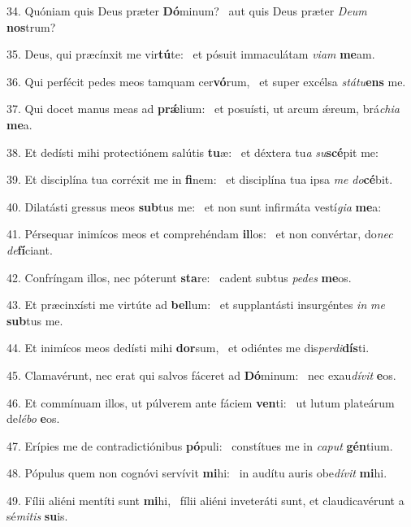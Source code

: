 34. Quóniam quis Deus præter \textbf{Dó}minum? \ast\  aut quis Deus præter \textit{De}\textit{um} \textbf{nos}trum?\

35. Deus, qui præcínxit me vir\textbf{tú}te: \ast\  et pósuit immaculátam \textit{vi}\textit{am} \textbf{me}am.\

36. Qui perfécit pedes meos tamquam cer\textbf{vó}rum, \ast\  et super excélsa \textit{stá}\textit{tu}\textbf{ens} me.\

37. Qui docet manus meas ad \textbf{prǽ}lium: \ast\  et posuísti, ut arcum ǽreum, brá\textit{chi}\textit{a} \textbf{me}a.\

38. Et dedísti mihi protectiónem salútis \textbf{tu}æ: \ast\  et déxtera tu\textit{a} \textit{su}\textbf{scé}pit me:\

39. Et disciplína tua corréxit me in \textbf{fi}nem: \ast\  et disciplína tua ipsa \textit{me} \textit{do}\textbf{cé}bit.\

40. Dilatásti gressus meos \textbf{sub}tus me: \ast\  et non sunt infirmáta vestí\textit{gi}\textit{a} \textbf{me}a:\

41. Pérsequar inimícos meos et comprehéndam \textbf{il}los: \ast\  et non convértar, do\textit{nec} \textit{de}\textbf{fí}ciant.\

42. Confríngam illos, nec póterunt \textbf{sta}re: \ast\  cadent subtus \textit{pe}\textit{des} \textbf{me}os.\

43. Et præcinxísti me virtúte ad \textbf{bel}lum: \ast\  et supplantásti insurgéntes \textit{in} \textit{me} \textbf{sub}tus me.\

44. Et inimícos meos dedísti mihi \textbf{dor}sum, \ast\  et odiéntes me dis\textit{per}\textit{di}\textbf{dís}ti.\

45. Clamavérunt, nec erat qui salvos fáceret ad \textbf{Dó}minum: \ast\  nec exau\textit{dí}\textit{vit} \textbf{e}os.\

46. Et commínuam illos, ut púlverem ante fáciem \textbf{ven}ti: \ast\  ut lutum plateárum de\textit{lé}\textit{bo} \textbf{e}os.\

47. Erípies me de contradictiónibus \textbf{pó}puli: \ast\  constítues me in \textit{ca}\textit{put} \textbf{gén}tium.\

48. Pópulus quem non cognóvi servívit \textbf{mi}hi: \ast\  in audítu auris obe\textit{dí}\textit{vit} \textbf{mi}hi.\

49. Fílii aliéni mentíti sunt \textbf{mi}hi, \ast\  fílii aliéni inveteráti sunt, et claudicavérunt a sé\textit{mi}\textit{tis} \textbf{su}is.\

